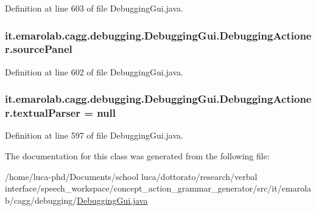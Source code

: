 Definition at line 603 of file Debugging\-Gui.\-java.

\hypertarget{classit_1_1emarolab_1_1cagg_1_1debugging_1_1DebuggingGui_1_1DebuggingActioner_ac31fec7501ef39345821128a54a82165}{
\subsubsection[{source\-Panel}]{ it.\-emarolab.\-cagg.\-debugging.\-Debugging\-Gui.\-Debugging\-Actioner.\-source\-Panel\hspace{0.3cm}{\ttfamily [private]}}}\label{classit_1_1emarolab_1_1cagg_1_1debugging_1_1DebuggingGui_1_1DebuggingActioner_ac31fec7501ef39345821128a54a82165}


Definition at line 602 of file Debugging\-Gui.\-java.

\hypertarget{classit_1_1emarolab_1_1cagg_1_1debugging_1_1DebuggingGui_1_1DebuggingActioner_a6014741e60917227611d32f4281b7fa9}{
\subsubsection[{textual\-Parser}]{ it.\-emarolab.\-cagg.\-debugging.\-Debugging\-Gui.\-Debugging\-Actioner.\-textual\-Parser = null\hspace{0.3cm}{\ttfamily [private]}}}\label{classit_1_1emarolab_1_1cagg_1_1debugging_1_1DebuggingGui_1_1DebuggingActioner_a6014741e60917227611d32f4281b7fa9}


Definition at line 597 of file Debugging\-Gui.\-java.



The documentation for this class was generated from the following file\-:\begin{DoxyCompactItemize}
\item 
/home/luca-\/phd/\-Documents/school luca/dottorato/research/verbal interface/speech\-\_\-workspace/concept\-\_\-action\-\_\-grammar\-\_\-generator/src/it/emarolab/cagg/debugging/\hyperlink{DebuggingGui_8java}{Debugging\-Gui.\-java}\end{DoxyCompactItemize}
